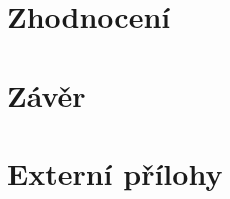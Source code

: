 \documentclass[male,czech,api_ing]{thesis}
\begin{document}




\chapter{Zhodnocení} 

\chapter{Závěr}

\printbibliography[title=Seznam použitých zdrojů]

\listoffigures

\lstlistoflistings

\appendix

\chapter{Externí přílohy\label{sec:ep}}


\end{document}
